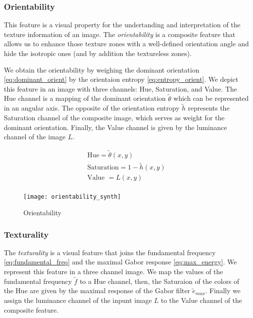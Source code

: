 \subsubsection{Orientability}
This feature is a visual property for the undertanding and interpretation of the texture information of an image. The \textit{orientability} is a composite feature that allows us to enhance those texture zones with a well-defined orientation angle and hide the isotropic ones (and by addition the textureless zones).

We obtain the orientability by weighing the dominant orientation \eqref{eq:dominant_orient} by the orientaion entropy \eqref{eq:entropy_orient}. We depict this feature in an image with three channels:  Hue, Saturation, and Value. The Hue channel is a mapping of the dominant orientation $\widetilde{\theta}$ which can be represented in an angular axis. The opposite of the orientation entropy $\widetilde{h}$ represents the Saturation channel of the composite image, which serves as weight for the dominant orientation. Finally, the Value channel is given by the luminance channel of the image $L$.

\begin{gather}
    \text{Hue} = \widetilde{\theta}(x,y) \\
    \text{Saturation} = 1 - \widetilde{h}(x,y) \\
    \text{Value }= L(x,y) \\
\end{gather}

\begin{figure}[!ht]
	\texttt{[image: orientability\_synth]}
    \caption{Orientability}
    \label{fig:orientability_synth}
\end{figure}

\subsubsection{Texturality}
The \textit{texturality} is a visual feature that joins the fundamental frequency \eqref{eq:fundamental_freq} and the maximal Gabor response \eqref{eq:max_energy}. We represent this feature in a three channel image. We map the values of the fundamental frequency $\widetilde{f}$ to a Hue channel, then, the Saturaion of the colors of the Hue are given by the maximal response of the Gabor filter $\widetilde{e}_{max}$. Finally we assign the luminance channel of the inpunt image $L$ to the Value channel of the composite feature. 

